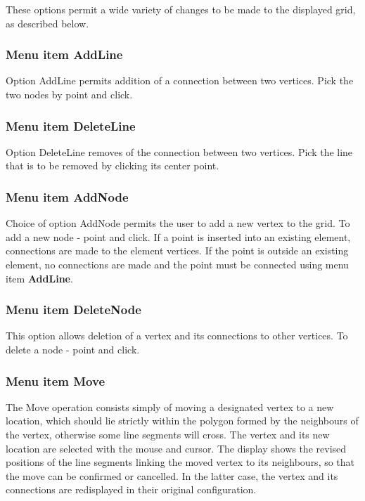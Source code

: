 \documentclass{article}
\begin{document}
These options permit a wide variety of changes to be made to the displayed grid, as described below.

\subsubsection[Menu item AddLine]{Menu item AddLine}
Option AddLine permits addition of a connection between two vertices. Pick the two nodes by point and click.

\subsubsection[Menu item DeleteLine]{Menu item DeleteLine}
Option DeleteLine removes of the connection between two vertices. Pick the line that is to be removed by clicking its center point.

\subsubsection[Menu item AddNode]{Menu item AddNode}
Choice of option AddNode permits the user to add a new vertex to the grid. To add a new node - point and click.
If a point is inserted into an existing element, connections are made to the element vertices. If the point is outside an existing element, no connections are made and the point must be connected using menu item {\bf AddLine}.

\subsubsection[Menu item DeleteNode]{Menu item DeleteNode}
This option allows deletion of a vertex and its connections to other vertices. To delete a node - point and click.

\subsubsection[Menu item Move]{Menu item Move}
The Move operation consists simply of moving a designated vertex to a new location, which should lie strictly within the polygon formed by the neighbours of the vertex, otherwise some line segments will cross. The vertex and its new location are selected with the mouse and cursor. The display shows the revised positions of the line segments linking the moved vertex to its neighbours, so that the move can be confirmed or cancelled. In the latter case, the vertex and its connections are redisplayed in their original configuration. 
\end{document}
